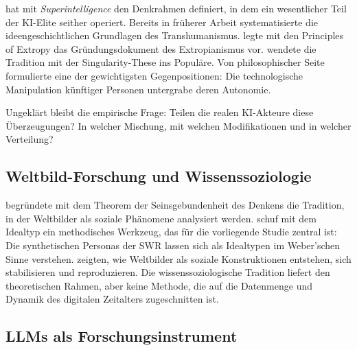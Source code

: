 \documentclass[12pt,a4paper]{article}
\begin{document}
\citet{Bostrom2014} hat mit \emph{Superintelligence} den Denkrahmen definiert, in dem ein wesentlicher Teil der KI-Elite seither operiert. Bereits in fr\"uherer Arbeit systematisierte \citet{Bostrom2005} die ideengeschichtlichen Grundlagen des Transhumanismus. \citet{More2003} legte mit den \glqq Principles of Extropy\grqq{} das Gr\"undungsdokument des Extropianismus vor. \citet{Kurzweil2005} wendete die Tradition mit der Singularity-These ins Popul\"are. Von philosophischer Seite formulierte \citet{Habermas2001} eine der gewichtigsten Gegenpositionen: Die technologische Manipulation k\"unftiger Personen untergrabe deren Autonomie.

Ungekl\"art bleibt die empirische Frage: Teilen die realen KI-Akteure diese \"Uberzeugungen? In welcher Mischung, mit welchen Modifikationen und in welcher Verteilung?


\subsection{Weltbild-Forschung und Wissenssoziologie}
\label{sec:forschungsstand:wissenssoziologie}

\citet{Mannheim1929} begr\"undete mit dem Theorem der \glqq Seinsgebundenheit des Denkens\grqq{} die Tradition, in der Weltbilder als soziale Ph\"anomene analysiert werden. \citet{Weber1904} schuf mit dem Idealtyp ein methodisches Werkzeug, das f\"ur die vorliegende Studie zentral ist: Die synthetischen Personas der SWR lassen sich als Idealtypen im Weber'schen Sinne verstehen. \citet{BergerLuckmann1966} zeigten, wie Weltbilder als soziale Konstruktionen entstehen, sich stabilisieren und reproduzieren. Die wissenssoziologische Tradition liefert den theoretischen Rahmen, aber keine Methode, die auf die Datenmenge und Dynamik des digitalen Zeitalters zugeschnitten ist.


\subsection{LLMs als Forschungsinstrument}
\label{sec:forschungsstand:llm}
\end{document}
